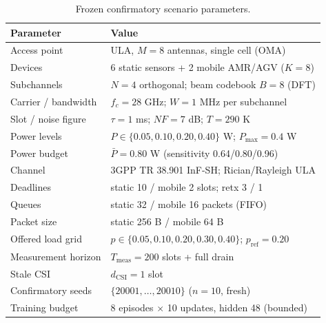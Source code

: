 \begin{table}[t]\centering\small
\caption{Frozen confirmatory scenario parameters.}\label{tab:scenario}
\begin{tabular}{@{}p{}p{}@{}}\toprule
Parameter & Value \\ \midrule
Access point & ULA, $M=8$ antennas, single cell (OMA) \\
Devices & 6 static sensors + 2 mobile AMR/AGV ($K=8$) \\
Subchannels & $N=4$ orthogonal; beam codebook $B=8$ (DFT) \\
Carrier / bandwidth & $f_c=28$ GHz; $W=1$ MHz per subchannel \\
Slot / noise figure & $\tau=1$ ms; $NF=7$ dB; $T=290$ K \\
Power levels & $P\in\{0.05,0.10,0.20,0.40\}$ W; $P_{\max}=0.4$ W \\
Power budget & $\bar P=0.80$ W (sensitivity 0.64/0.80/0.96) \\
Channel & 3GPP TR 38.901 InF-SH; Rician/Rayleigh ULA \\
Deadlines & static 10 / mobile 2 slots; retx 3 / 1 \\
Queues & static 32 / mobile 16 packets (FIFO) \\
Packet size & static 256 B / mobile 64 B \\
Offered load grid & $p\in\{0.05,0.10,0.20,0.30,0.40\}$; $p_{\mathrm{ref}}=0.20$ \\
Measurement horizon & $T_{\mathrm{meas}}=200$ slots + full drain \\
Stale CSI & $d_{\mathrm{CSI}}=1$ slot \\
Confirmatory seeds & $\{20001,\dots,20010\}$ ($n=10$, fresh) \\
Training budget & 8 episodes $\times$ 10 updates, hidden 48 (bounded) \\
\bottomrule\end{tabular}\end{table}